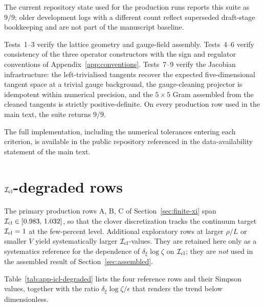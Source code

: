\documentclass[a4paper,11pt]{article}
\theoremstyle{definition}
\newcommand{\Icl}{\mathcal{I}_{\rm cl}}
\begin{document}
The current repository state used for the production runs reports this
suite as $9/9$; older development logs with a different count reflect
superseded draft-stage bookkeeping and are not part of the manuscript
baseline.

Tests~1--3 verify the lattice geometry and gauge-field assembly.
Tests~4--6 verify consistency of the three operator constructors with
the sign and regulator conventions of Appendix~\ref{app:conventions}.
Tests~7--9 verify the Jacobian infrastructure: the left-trivialised
tangents recover the expected five-dimensional tangent space at a
trivial gauge background, the gauge-cleaning projector is idempotent
within numerical precision, and the $5\times 5$ Gram assembled from the
cleaned tangents is strictly positive-definite. On every production row
used in the main text, the suite returns $9/9$.

The full implementation, including the numerical tolerances entering
each criterion, is available in the public repository referenced in the
data-availability statement of the main text.



\section{$\Icl$-degraded rows}
\label{app:icl-degraded}

The primary production rows A, B, C of Section~\ref{sec:finite-xi} span
$\Icl \in [0.983,\,1.032]$, so that the clover discretization tracks the
continuum target $\Icl = 1$ at the few-percent level. Additional
exploratory rows at larger $\rho/L$ or smaller $V$ yield systematically
larger $\Icl$-values. They are retained here only as a systematics
reference for the dependence of $\delta_\xi \log\zeta$ on $\Icl$; they
are \emph{not} used in the assembled result of
Section~\ref{sec:assembled}.

Table~\ref{tab:app-icl-degraded} lists the four reference rows and their
Simpson values, together with the ratio $\delta_\xi \log\zeta / \epsilon$
that renders the trend below dimensionless.
\end{document}
